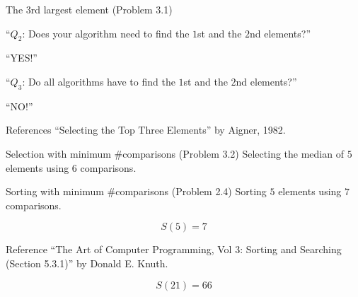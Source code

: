 \begin{frame}{The $3$rd largest element (Problem 3.1)}
  \begin{center}
	``$Q_2$: Does your algorithm need to find the $1$st and the $2$nd elements?'' \\[0.30cm] \pause

	``YES!''
  \end{center}

  \pause
  \begin{center}
	``$Q_3$: Do all algorithms have to find the $1$st and the $2$nd elements?'' \\[0.30cm] \pause

	``NO!''
  \end{center}

  \pause
  \begin{alertblock}{References}
	``Selecting the Top Three Elements'' by Aigner, 1982.
  \end{alertblock}


\end{frame}
\begin{frame}{Selection with minimum \#comparisons (Problem 3.2)}
  Selecting the median of $5$ elements using $6$ comparisons.

\end{frame}
\begin{frame}{Sorting with minimum \#comparisons (Problem 2.4)}
  Sorting $5$ elements using $7$ comparisons.

  \[
    S(5) = 7
  \]

  \pause
  \begin{alertblock}{Reference}
	``The Art of Computer Programming, Vol 3: Sorting and Searching (Section 5.3.1)'' by Donald E. Knuth.
  \end{alertblock}

  \[
	S(21) = 66
  \]
\end{frame}
